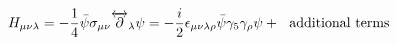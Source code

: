\begin{equation}
H_{\mu \nu \lambda} = - \frac{1}{4} \bar{\psi} \sigma_{\mu \nu}
\overleftrightarrow{\partial}_{\lambda} \psi = -\frac{i}{2}
\epsilon_{\mu \nu \lambda \rho} \bar{\psi} \gamma_{5} \gamma_{\rho} \psi + 
~~{\rm additional~ terms}                 \label{eq:hx}
\end{equation}

